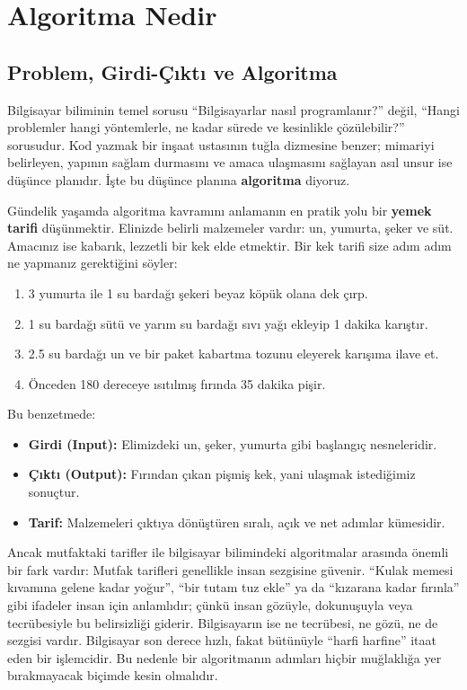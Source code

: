 \chapter[Algoritma Nedir · \textit{Temel}]{Algoritma Nedir}

\section{Problem, Girdi-Çıktı ve Algoritma}

Bilgisayar biliminin temel sorusu ``Bilgisayarlar nasıl programlanır?'' değil, ``Hangi problemler hangi yöntemlerle, ne kadar sürede ve kesinlikle çözülebilir?'' sorusudur. Kod yazmak bir inşaat ustasının tuğla dizmesine benzer; mimariyi belirleyen, yapının sağlam durmasını ve amaca ulaşmasını sağlayan asıl unsur ise düşünce planıdır. İşte bu düşünce planına \textbf{algoritma} diyoruz.

Gündelik yaşamda algoritma kavramını anlamanın en pratik yolu bir \textbf{yemek tarifi} düşünmektir. Elinizde belirli malzemeler vardır: un, yumurta, şeker ve süt. Amacınız ise kabarık, lezzetli bir kek elde etmektir. Bir kek tarifi size adım adım ne yapmanız gerektiğini söyler:
\begin{enumerate}
    \item 3 yumurta ile 1 su bardağı şekeri beyaz köpük olana dek çırp.
    \item 1 su bardağı sütü ve yarım su bardağı sıvı yağı ekleyip 1 dakika karıştır.
    \item 2.5 su bardağı un ve bir paket kabartma tozunu eleyerek karışıma ilave et.
    \item Önceden 180 dereceye ısıtılmış fırında 35 dakika pişir.
\end{enumerate}

Bu benzetmede:
\begin{itemize}
    \item \textbf{Girdi (Input):} Elimizdeki un, şeker, yumurta gibi başlangıç nesneleridir.
    \item \textbf{Çıktı (Output):} Fırından çıkan pişmiş kek, yani ulaşmak istediğimiz sonuçtur.
    \item \textbf{Tarif:} Malzemeleri çıktıya dönüştüren sıralı, açık ve net adımlar kümesidir.
\end{itemize}

Ancak mutfaktaki tarifler ile bilgisayar bilimindeki algoritmalar arasında önemli bir fark vardır: Mutfak tarifleri genellikle insan sezgisine güvenir. ``Kulak memesi kıvamına gelene kadar yoğur'', ``bir tutam tuz ekle'' ya da ``kızarana kadar fırınla'' gibi ifadeler insan için anlamlıdır; çünkü insan gözüyle, dokunuşuyla veya tecrübesiyle bu belirsizliği giderir. Bilgisayarın ise ne tecrübesi, ne gözü, ne de sezgisi vardır. Bilgisayar son derece hızlı, fakat bütünüyle ``harfi harfine'' itaat eden bir işlemcidir. Bu nedenle bir algoritmanın adımları hiçbir muğlaklığa yer bırakmayacak biçimde kesin olmalıdır.

